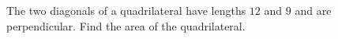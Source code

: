 The two diagonals of a quadrilateral have lengths $12$ and $9$ and are perpendicular. Find the area of the quadrilateral.
